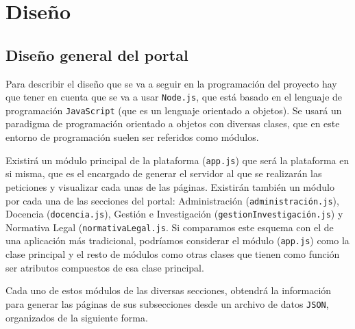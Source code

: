 \chapter{Diseño}

\section{Diseño general del portal}

Para describir el diseño que se va a seguir en la programación del proyecto hay que tener en cuenta que se va a usar {\tt Node.js}, que está basado en el lenguaje de programación {\tt JavaScript} (que es un lenguaje orientado a objetos). Se usará un paradigma de programación orientado a objetos con diversas clases, que en este entorno de programación suelen ser referidos como módulos.

\bigskip
Existirá un módulo principal de la plataforma ({\tt app.js}) que será la plataforma en si misma, que es el encargado de generar el servidor al que se realizarán las peticiones y visualizar cada unas de las páginas. Existirán también un módulo por cada una de las secciones del portal: Administración ({\tt administración.js}), Docencia ({\tt docencia.js}), Gestión e Investigación ({\tt gestionInvestigación.js}) y Normativa Legal ({\tt normativaLegal.js}. Si comparamos este esquema con el de una aplicación más tradicional, podríamos considerar el módulo ({\tt app.js}) como la clase principal y el resto de módulos como otras clases que tienen como función ser atributos compuestos de esa clase principal.

\bigskip
Cada uno de estos módulos de las diversas secciones, obtendrá la información para generar las páginas de sus subsecciones desde un archivo de datos {\tt JSON}, organizados de la siguiente forma.


